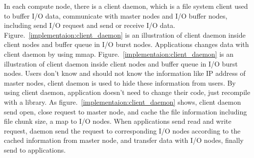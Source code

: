 In each compute node, there is a client daemon, which is a file system client used to buffer I/O
data, communicate with master nodes and I/O buffer nodes, including send I/O request and send or
receive I/O data.
Figure.~\ref{implementaion:client_daemon} is an illustration of client daemon inside client nodes
and buffer queue in I/O burst nodes.
Applications changes data with client daemon by using mmap.
 Figure.~\ref{implementaion:client_daemon}
is an illustration of client daemon inside client nodes and buffer queue in I/O burst nodes.
Users don't know and should not know the information like IP address of master nodes,  client daemon
is used to hide these information from users.
By using client daemon, application doesn't need to change their code, just recompile with a
library.
As figure.~\ref{implementaion:client_daemon} shows, client daemon send open, close request to master
node, and cache the file information including file chunk size, a map to I/O nodes.
When applications send read and write request, daemon send the request to corresponding I/O nodes
according to the cached information from master node, and transfer data with I/O nodes, finally
send to applications.



